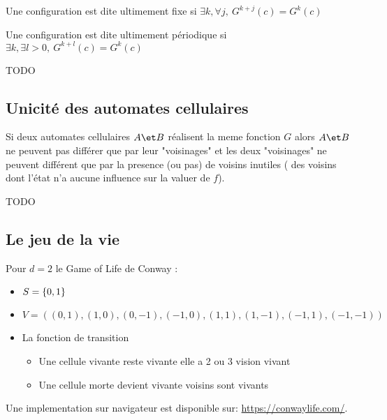 \begin{definition}
	Une configuration est dite ultimement fixe si $\exists k, \forall j, \ G^{k+j}(c) =  G^{k}(c)$
\end{definition}


\begin{definition}
	Une configuration est dite ultimement périodique si $\exists k, \exists l>0, \ G^{k+l}(c) =  G^{k}(c)$
\end{definition}


\begin{exemple}
	TODO
\end{exemple}


\subsection{Unicité des automates cellulaires}


\begin{theorem}
	Si deux automates cellulaires $A \et B$ réalisent la meme fonction $G$ alors $A \et B$ ne peuvent pas différer que par
	leur "voisinages" et les deux "voisinages" ne peuvent différent que par la presence (ou pas) de voisins inutiles (\cad
	des voisins dont l'état n'a aucune influence sur la valuer de $f$).
\end{theorem}


\begin{exemple}
	TODO
\end{exemple}

\subsection{Le jeu de la vie}

\begin{exemple}
	Pour $d = 2$ le Game of Life de Conway \cite{conwayGOL}:
	\begin{itemize}
		\item $S = \left\{0,1\right\}$
		\item $V = ((0,1), (1,0), (0,-1), (-1,0), (1,1), (1,-1), (-1,1), (-1,-1))$
		\item La fonction de transition
		      \begin{itemize}
			      \item Une cellule vivante reste vivante \ssi elle a 2 ou 3 vision vivant
			      \item Une cellule morte devient vivante  voisins sont vivants
		      \end{itemize}
	\end{itemize}


	Une implementation sur navigateur est disponible sur: \url{https://conwaylife.com/}.
\end{exemple}


